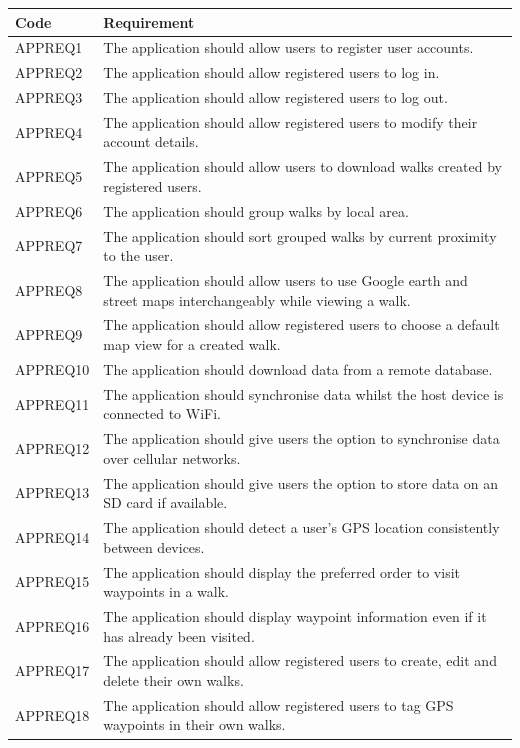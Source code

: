 \documentclass[11pt,a4paper]{article}
\begin{document}
\begin{longtable}{|p{2.5cm}p{13cm}|}
\hline
\textbf{Code} & \textbf{Requirement} \\
\hline
APPREQ1 & The application should allow users to register user accounts. \\ \hline
APPREQ2 & The application should allow registered users to log in. \\ \hline
APPREQ3 & The application should allow registered users to log out. \\ \hline
APPREQ4 & The application should allow registered users to modify their account details. \\ \hline
APPREQ5 & The application should allow users to download walks created by registered users. \\ \hline
APPREQ6 & The application should group walks by local area. \\ \hline
APPREQ7 & The application should sort grouped walks by current proximity to the user. \\ \hline
APPREQ8 & The application should allow users to use Google earth and street maps interchangeably while viewing a walk. \\ \hline
APPREQ9 & The application should allow registered users to choose a default map view for a created walk. \\ \hline
APPREQ10 & The application should download data from a remote database. \\ \hline
APPREQ11 & The application should synchronise data whilst the host device is connected to WiFi. \\ \hline
APPREQ12 & The application should give users the option to synchronise data over cellular networks. \\ \hline
APPREQ13 & The application should give users the option to store data on an SD card if available. \\ \hline
APPREQ14 & The application should detect a user's GPS location consistently between devices. \\ \hline
APPREQ15 & The application should display the preferred order to visit waypoints in a walk. \\ \hline
APPREQ16 & The application should display waypoint information even if it has already been visited. \\ \hline
APPREQ17 & The application should allow registered users to create, edit and delete their own walks. \\ \hline
APPREQ18 & The application should allow registered users to tag GPS waypoints in their own walks. \\ \hline

\end{longtable}
\end{document}
